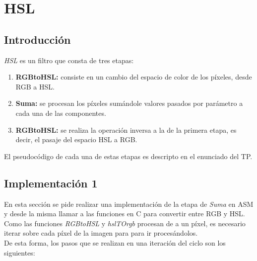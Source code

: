 \section{HSL}
\subsection{Introducción}
\textit{HSL} es un filtro que consta de tres etapas:
\begin{enumerate}
\item \textbf{RGBtoHSL:} consiste en un cambio del espacio de color de los píxeles, desde RGB a HSL. 
\item \textbf{Suma:} se procesan los píxeles sumándole valores pasados por parámetro a cada una de las componentes.
\item \textbf{RGBtoHSL:} se realiza la operación inversa a la de la primera etapa, es decir, el pasaje del espacio HSL a RGB.
\end{enumerate}

El pseudocódigo de cada una de estas etapas es descripto en el enunciado del TP.

\subsection{Implementación 1}
En esta sección se pide realizar una implementación de la etapa de \textit{Suma} en ASM y desde la misma llamar a las funciones en C para convertir entre RGB y HSL.\\
Como las funciones \textit{RGBtoHSL} y \textit{hslTOrgb} procesan de a un píxel, es necesario iterar sobre cada píxel de la imagen para para ir procesándolos.\\

De esta forma, los pasos que se realizan en una iteración del ciclo son los siguientes:


